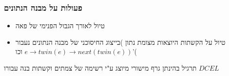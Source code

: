 \documentclass{article}
\makeatletter
\newcommand*{\saved@uline}{}
\let\saved@uline\uline
\newcommand*{\mathuline}{%
  \mathpalette{\math@uline\saved@uline}%
}
\newcommand*{\math@uline}[3]{%
  \mbox{#1{$#2#3\m@th$}}%
}
\renewcommand*{\uline}{%
  \relax  
  \ifmmode
    \expandafter\mathuline
  \else
    \expandafter\saved@uline
  \fi
}
\makeatother
\begin{document}
\subsubsection{פעולות על מבנה הנתונים}
\begin{itemize}
\item טיול לאורך הגבול הפנימי של פאה
\item טיול על הקשתות היוצאות מצומת נתון )בייצוג החיסוכני של מבנה הנתונים נעבור $e\rightarrow twin(e) \rightarrow next(twin(e)) $ וכו'(	
\end{itemize}

\uline{תרגיל} בהינתן גרף מישורי מיוצג ע"י רשימה של צמתים וקשתות בנה עבורו $DCEL$
\end{document}
